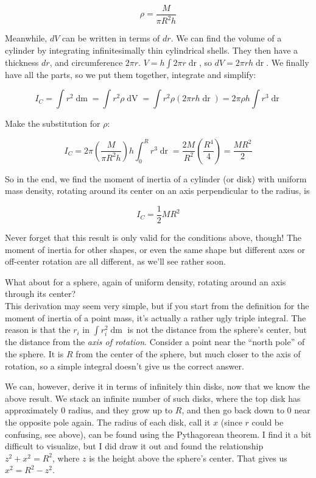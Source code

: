 \begin{equation}
\rho = \frac{M}{\pi R^2 h}
\end{equation}

Meanwhile, $dV$ can be written in terms of $dr$. We can find the volume of a cylinder by integrating infinitesimally thin cylindrical shells. They then have a thickness $dr$, and circumference $2 \pi r$. $V = h \int 2 \pi r \mathop{dr}$, so $dV = 2 \pi r h \mathop{dr}$. We finally have all the parts, so we put them together, integrate and simplify:

\begin{equation}
I_C = \int r^2 \mathop{dm} = \int r^2 \rho \mathop{dV} = \int r^2 \rho (2 \pi r h \mathop{dr}) = 2 \pi \rho h \int r^3 \mathop{dr}
\end{equation}

Make the substitution for $\rho$:

\begin{equation}
I_C = 2 \pi \left( \frac{M}{\pi R^2 h}\right) h \int_0^R r^3 \mathop{dr} = \frac{2 M}{R^2} \left(\frac{R^4}{4}\right) = \frac{M R^2}{2}
\end{equation}

So in the end, we find the moment of inertia of a cylinder (or disk) with uniform mass density, rotating around its center on an axis perpendicular to the radius, is 

\begin{equation}
I_C = \frac{1}{2} M R^2
\end{equation}

Never forget that this result is only valid for the conditions above, though! The moment of inertia for other shapes, or even the same shape but different axes or off-center rotation are all different, as we'll see rather soon. 

What about for a sphere, again of uniform density, rotating around an axis through its center?\\
This derivation may seem very simple, but if you start from the definition for the moment of inertia of a point mass, it's actually a rather ugly triple integral. The reason is that the $r_i$ in $\int r_i^2 \mathop{dm}$ is not the distance from the sphere's center, but the distance from the \emph{axis of rotation}. Consider a point near the ``north pole'' of the sphere. It is $R$ from the center of the sphere, but much closer to the axis of rotation, so a simple integral doesn't give us the correct answer.

We can, however, derive it in terms of infinitely thin disks, now that we know the  above result. We stack an infinite number of such disks, where the top disk has approximately 0 radius, and they grow up to $R$, and then go back down to 0 near the opposite pole again. The radius of each disk, call it $x$ (since $r$ could be confusing, see above), can be found using the Pythagorean theorem. I find it a bit difficult to visualize, but I did draw it out and found the relationship $z^2 + x^2 = R^2$, where $z$ is the height above the sphere's center. That gives us $x^2 = R^2 - z^2$.

